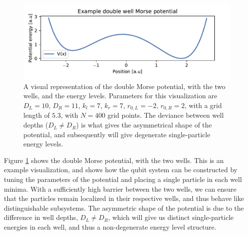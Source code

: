 \documentclass{subfiles}
\begin{document}
\begin{figure}[h!]
    \centering
    \includegraphics[width=1.0\textwidth]{figs/double_well_potential.pdf}
    \caption{A visual representation of the double Morse potential, with the two wells, and the energy levels. Parameters for this visualization are $D_L=10$, $D_R=11$, $k_l=7$, $k_r=7$, $r_{0,L}=-2$, $r_{0,R}=2$, with a grid length of $5.3$, with $N=400$ grid points. The deviance between well depths ($D_L \neq D_R$) is what gives the asymmetrical shape of the potential, and subsequently will give degenerate single-particle energy levels.} 
    \label{fig:double_well_morse_potential}
\end{figure}
Figure \ref{fig:double_well_morse_potential} shows the double Morse potential, with the two wells. This is an example visualization, and shows how the qubit system can be constructed by tuning the parameters of the potential and placing a single particle in each well minima. With a sufficiently high barrier between the two wells, we can ensure that the particles remain localized in their respective wells, and thus behave like distinguishable subsystems. The asymmetric shape of the potential is due to the difference in well depths, $D_L \neq D_R$, which will give us distinct single-particle energies in each well, and thus a non-degenerate energy level structure.  
\newpage
\end{document}
